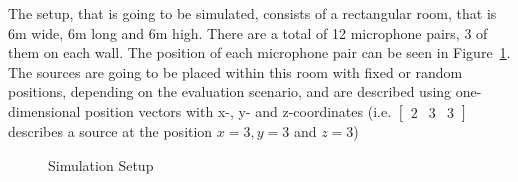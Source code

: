 The setup, that is going to be simulated, consists of a rectangular room, that is 6m wide, 6m long and 6m high. There are a total of 12 microphone pairs, 3 of them on each wall. The position of each microphone pair can be seen in Figure~\ref{fig:setup}. The sources are going to be placed within this room with fixed or random positions, depending on the evaluation scenario, and are described using one-dimensional position vectors with x-, y- and z-coordinates (i.e. $\begin{bmatrix} 2&3&3  \end{bmatrix}$ describes a source at the position $x=3, y=3$ and $z=3$)

\begin{figure}[H]
	\centering
	
	\caption{Simulation Setup}
	\label{fig:setup}
\end{figure}

